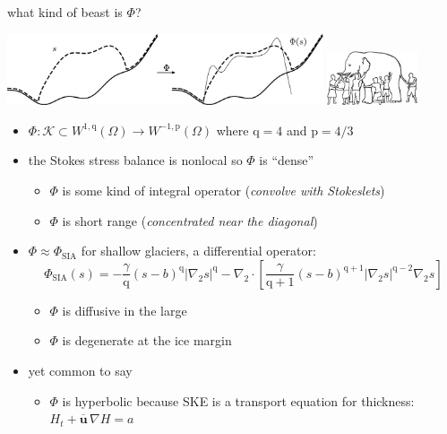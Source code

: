\documentclass[usepdftitle=false,usenames,dvipsnames]{beamer}
\newcommand{\grad}{\nabla}
\newcommand{\bu}{\mathbf{u}}
\newcommand{\pp}{{\text{p}}}
\newcommand{\qq}{{\text{q}}}
\begin{document}
\begin{frame}{what kind of beast is $\Phi$?}

\begin{center}
\includegraphics[width=0.7\textwidth]{figs/idoaction.png} \hfill \includegraphics[width=0.2\textwidth]{figs/elephant.png}
\end{center}

\begin{itemize}
\small
\item $\Phi : \mathcal{K} \subset W^{1,\qq}(\Omega) \to W^{-1,\pp}(\Omega)$ where $\qq=4$ and $\pp=4/3$
\item the Stokes stress balance is nonlocal so $\Phi$ is ``dense''
    \begin{itemize}
    \item $\Phi$ is some kind of integral operator (\emph{convolve with Stokeslets})
    \item $\Phi$ is short range (\emph{concentrated near the diagonal})
    \end{itemize}
\item $\Phi \approx \Phi_{\text{SIA}}$ for shallow glaciers, a differential operator:
    $$\Phi_{\text{SIA}}(s) = - \frac{\gamma}{\qq} (s-b)^{\qq} |\grad_2 s|^{\qq} - \grad_2 \cdot\left[\frac{\gamma}{\qq+1} (s-b)^{\qq+1} |\grad_2 s|^{\qq-2} \grad_2 s\right]$$

    \begin{itemize}
    \item $\Phi$ is diffusive in the large
    \item $\Phi$ is degenerate at the ice margin
    \end{itemize}
\item yet common to say
    \begin{itemize}
    \item $\Phi$ is hyperbolic because SKE is a transport equation for thickness: $H_t + \overline{\bu}\, \grad H = a$
    \end{itemize}
\end{itemize}
\end{frame}
\end{document}
